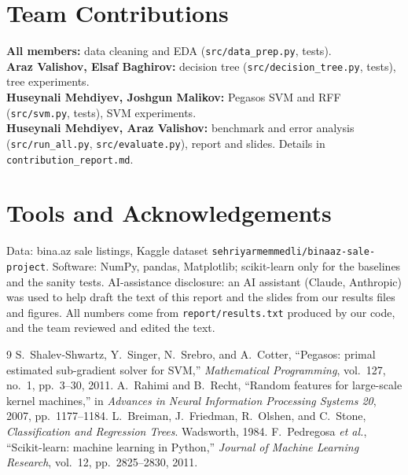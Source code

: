 \documentclass[10pt,twocolumn,a4paper]{article}
\begin{document}
\section*{Team Contributions}
{\raggedright\noindent\textbf{All members:} data cleaning and EDA
(\texttt{src/data\_prep.py}, tests).\\
\textbf{Araz Valishov, Elsaf Baghirov:} decision tree (\texttt{src/decision\_tree.py},
tests), tree experiments.\\
\textbf{Huseynali Mehdiyev, Joshgun Malikov:} Pegasos SVM and RFF (\texttt{src/svm.py},
tests), SVM experiments.\\
\textbf{Huseynali Mehdiyev, Araz Valishov:} benchmark and error analysis (\texttt{src/run\_all.py},
\texttt{src/evaluate.py}), report and slides. Details in
\texttt{contribution\_report.md}.\par}

\section*{Tools and Acknowledgements}
Data: bina.az sale listings, Kaggle dataset
\texttt{sehriyarmemmedli/binaaz-sale-project}. Software: NumPy, pandas,
Matplotlib; scikit-learn only for the baselines and the sanity tests.
AI-assistance disclosure: an AI assistant (Claude, Anthropic) was used to
help draft the text of this report and the slides from our
results files and figures. All numbers come from \texttt{report/results.txt}
produced by our code, and the team reviewed and edited the text.

\begin{thebibliography}{9}
S.~Shalev-Shwartz, Y.~Singer, N.~Srebro, and A.~Cotter,
``Pegasos: primal estimated sub-gradient solver for SVM,''
\emph{Mathematical Programming}, vol.~127, no.~1, pp.~3--30, 2011.
A.~Rahimi and B.~Recht, ``Random features for large-scale kernel
machines,'' in \emph{Advances in Neural Information Processing Systems
20}, 2007, pp.~1177--1184.
L.~Breiman, J.~Friedman, R.~Olshen, and C.~Stone, \emph{Classification
and Regression Trees}. Wadsworth, 1984.
F.~Pedregosa \emph{et al.}, ``Scikit-learn: machine learning in Python,''
\emph{Journal of Machine Learning Research}, vol.~12, pp.~2825--2830, 2011.
\end{thebibliography}
\end{document}
